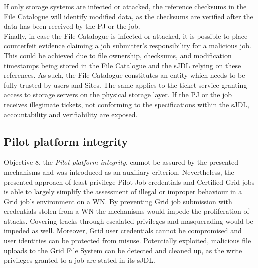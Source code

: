\documentclass[10pt]{iopart}
\begin{document}
If only storage systems are infected or attacked, the reference checksums in the
File Catalogue will identify modified data, as the checksums are verified after
the data has been received by the PJ or the job.\\
Finally, in case the File Catalogue is infected or attacked, it is possible to
place counterfeit evidence claiming a job submitter's responsibility for a malicious
job. This could be achieved due to file ownership, checksums, and modification
timestamps being stored in the File Catalogue and the sJDL relying on these
references. As such, the File Catalogue constitutes an entity which needs to
be fully trusted by users and Sites. The same applies to the ticket service
granting access to storage servers on the physical storage layer. If the PJ or
the job receives illegimate tickets, not conforming to the
specifications within the sJDL, accountability and verifiability are exposed.

\subsection{Pilot platform integrity}
\label{ppi}
Objective 8, the \textit{Pilot platform integrity}, cannot be assured by
the presented mechanisms and was introduced
as an auxiliary criterion. Nevertheless, the presented approach
of least-privilege Pilot Job credentials
and Certified Grid jobs is able to largely simplify the assessment of illegal or 
improper behaviour in a Grid job's environment on a WN.
By preventing Grid job submission with credentials stolen from a WN
the mechanisms would impede the proliferation of attacks.  Covering tracks
through escalated privileges and masquerading would be impeded as well.
Moreover, Grid
user credentials cannot be compromised and user identities can be protected
from misuse. Potentially exploited,
malicious file uploads to the Grid File System can be detected and cleaned up,
as the write privileges granted to a job are stated in its sJDL.
\end{document}
